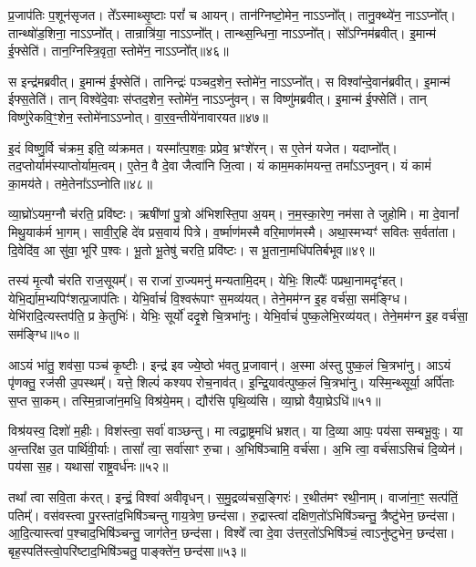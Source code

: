 प्र॒जा\-प॑तिः प॒शून॑\-सृजत।
ते᳚ऽस्माथ्सृ॒ष्टाः परां᳚ च आयन्।
तान॑ग्निष्टो॒मेन॒ नाऽऽप्नो᳚त्।
तानु॒क्थ्ये॑न॒ नाऽऽप्नो᳚त्।
तान्थ्षो॑ड॒शिना॒ नाऽऽप्नो᳚त्।
तान्रात्रि॑या॒ नाऽऽप्नो᳚त्।
तान्थ्स॒न्धिना॒ नाऽऽप्नो᳚त्।
सो᳚ऽग्निम॑ब्रवीत्।
इ॒मान्म॑ ई॒फ्सेति॑।
तान॒ग्निस्त्रि॒वृता॒ स्तोमे॑न॒ नाऽऽप्नो᳚त्॥४६॥

स इन्द्र॑मब्रवीत्।
इ॒मान्म॑ ई॒फ्सेति॑।
तानिन्द्रः॑ पञ्चद॒शेन॒ स्तोमे॑न॒ नाऽऽप्नो᳚त्।
स विश्वा᳚न्दे॒वान॑ब्रवीत्।
इ॒मान्म॑ ईफ्स॒तेति॑।
तान् विश्वे॑दे॒वाः स॑प्तद॒शेन॒ स्तोमे॑न॒ नाऽऽप्नु॑वन्।
स विष्णु॑मब्रवीत्।
इ॒मान्म॑ ई॒फ्सेति॑।
तान् विष्णु॑रेकवि॒ꣳ॒शेन॒ स्तोमे॑नाऽऽप्नोत्।
वा॒र॒व॒न्तीये॑नावारयत॥४७॥

इ॒दं विष्णु॒र्वि च॑क्रम॒ इति॒ व्य॑क्रमत।
यस्मा᳚त्प॒शवः॒ प्रप्रेव॒ भ्रꣳशे॑रन्।
स ए॒तेन॑ यजेत।
यदाप्नो᳚त्।
तद॒प्तोर्याम॑स्याप्तोर्याम॒\-त्वम्।
ए॒तेन॒ वै दे॒वा जैत्वा॑नि जि॒त्वा।
यं काम॒मका॑मयन्त॒ तमा᳚ऽऽप्नुवन्।
यं कामं॑ का॒मय॑ते।
तमे॒तेना᳚ऽऽप्नोति॥४८॥

व्या॒घ्रो॑\-ऽयम॒ग्नौ च॑रति॒ प्रवि॑ष्टः।
ऋषी॑णां पु॒त्रो अ॑भिशस्ति॒पा अ॒यम्।
न॒म॒स्का॒रेण॒ नम॑सा ते जुहोमि।
मा दे॒वानां᳚ मिथु॒याक॑र्म भा॒गम्।
सावी॒र्॒हि दे॑व प्रस॒वाय॑ पित्रे।
व॒र्ष्माण॑मस्मै वरि॒माण॑मस्मै।
अथा॒स्मभ्यꣳ॑ सवितः स॒र्वता॑ता।
दि॒वेदि॑व॒ आ सु॑वा॒ भूरि॑ प॒श्वः।
भू॒तो भू॒तेषु॑ चरति॒ प्रवि॑ष्टः।
स भू॒ताना॒मधि॑पतिर्बभूव॥४९॥

तस्य॑ मृ॒त्यौ च॑रति राज॒सूयम्᳚।
स राजा॑ रा॒ज्यमनु॑ मन्यतामि॒दम्।
येभिः॒ शिल्पैः᳚ पप्रथा॒नामदृꣳ॑हत्।
येभि॒र्द्याम॒भ्यपिꣳ॑\-शत्प्र॒जा\-प॑तिः।
येभि॒र्वाचं॑ वि॒श्वरू॑पाꣳ स॒मव्य॑यत्।
तेने॒मम॑ग्न इ॒ह वर्च॑सा॒ सम॑ङ्ग्धि।
येभि॑रादि॒त्यस्तप॑ति॒ प्र के॒तुभिः॑।
येभिः॒ सूर्यो॑ ददृ॒शे चि॒त्रभा॑नुः।
येभि॒र्वाचं॑ पुष्क॒लेभि॒रव्य॑यत्।
तेने॒मम॑ग्न इ॒ह वर्च॑सा॒ सम॑ङ्ग्धि॥५०॥

आऽयं भा॑तु॒ शव॑सा॒ पञ्च॑ कृ॒ष्टीः।
इन्द्र॑ इव ज्ये॒ष्ठो भ॑वतु प्र॒जावान्॑।
अ॒स्मा अ॑स्तु पुष्क॒लं चि॒त्रभा॑नु।
आऽयं पृ॑णक्तु॒ रज॑सी उ॒पस्थम्᳚।
यत्ते॒ शिल्पं॑ कश्यप रोच॒नाव॑त्।
इ॒न्द्रि॒याव॑त्पुष्क॒लं चि॒त्रभा॑नु।
यस्मि॒न्थ्सूर्या॒ अर्पि॑ताः स॒प्त सा॒कम्।
तस्मि॒न्राजा॑न॒मधि॒ विश्र॑ये॒मम्।
द्यौर॑सि पृथि॒व्य॑सि।
व्या॒घ्रो वैया॒घ्रे\-ऽधि॑॥५१॥

विश्र॑यस्व॒ दिशो॑ म॒हीः।
विश॑स्त्वा॒ सर्वा॑ वाञ्छन्तु।
मा त्वद्रा॒ष्ट्रमधि॑ भ्रशत्।
या दि॒व्या आपः॒ पय॑सा सम्बभू॒वुः।
या अ॒न्तरि॑क्ष उ॒त पार्थि॑वी॒र्याः।
तासां᳚ त्वा॒ सर्वा॑साꣳ रु॒चा।
अ॒भिषि॑ञ्चामि॒ वर्च॑सा।
अ॒भि त्वा॒ वर्च॑सा\-ऽसिचं दि॒व्येन॑।
पय॑सा स॒ह।
यथासा॑ राष्ट्र॒वर्ध॑नः॥५२॥

तथा᳚ त्वा सवि॒ता क॑रत्।
इन्द्रं॒ विश्वा॑ अवीवृधन्।
स॒मु॒द्रव्य॑चस॒ङ्गिरः॑।
र॒थीत॑मꣳ रथी॒नाम्।
वाजा॑ना॒ꣳ॒ सत्प॑तिं॒ पतिम्᳚।
वस॑वस्त्वा पु॒रस्ता॑द॒भिषि॑ञ्चन्तु गाय॒त्रेण॒ छन्द॑सा।
रु॒द्रास्त्वा॑ दक्षिण॒तो॑\-ऽभिषि॑ञ्चन्तु॒ त्रैष्टु॑भेन॒ छन्द॑सा।
आ॒दि॒त्यास्त्वा॑ प॒श्चाद॒भिषि॑ञ्चन्तु॒ जाग॑तेन॒ छन्द॑सा।
विश्वे᳚ त्वा दे॒वा उ॑त्तर॒तो॑\-ऽभिषि॑ञ्चं॒ त्वाऽनु॑ष्टुभेन॒ छन्द॑सा। 
बृह॒स्पति॑स्त्वो॒परि॑ष्टाद॒भिषि॑ञ्चतु॒ पाङ्क्ते॑न॒ छन्द॑सा॥५३॥

